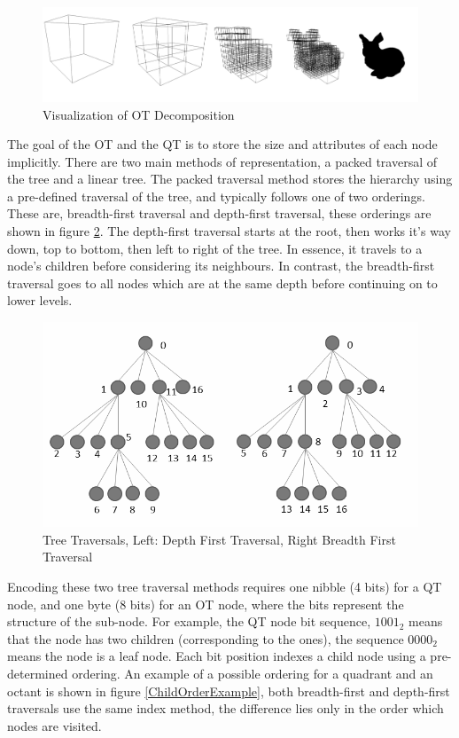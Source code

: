 \begin{figure}[!h]
\centering
\includegraphics[width=16cm]{images/ch2/OctreeExample}
\caption{Visualization of OT Decomposition}
\label{OctreeExample}
\end{figure}


The goal of the OT and the QT is to store the size and attributes of each node implicitly. There are two main methods of representation, a packed traversal of the tree and a linear tree. The packed traversal method stores the hierarchy using a pre-defined traversal of the tree, and typically follows one of two orderings. These are, breadth-first traversal and depth-first traversal, these orderings are shown in figure \ref{TreeTraversalExample}. The depth-first traversal starts at the root, then works it's way down, top to bottom, then left to right of the tree. In essence, it travels to a node's children before considering its neighbours. In contrast, the breadth-first traversal goes to all nodes which are at the same depth before continuing on to lower levels. 

\begin{figure}[!h]
\centering
\includegraphics[width=12cm]{images/ch2/TreeTraversalExample}
\caption{Tree Traversals, Left: Depth First Traversal, Right Breadth First Traversal}
\label{TreeTraversalExample}
\end{figure}

Encoding these two tree traversal methods requires one nibble (4 bits) for a QT node, and one byte (8 bits) for an OT node, where the bits represent the structure of the sub-node. For example, the QT node bit sequence, $1001_2$ means that the node has two children (corresponding to the ones), the sequence $0000_2$ means the node is a leaf node. Each bit position indexes a child node using a pre-determined ordering. An example of a possible ordering for a quadrant and an octant is shown in figure \ref{ChildOrderExample}, both breadth-first and depth-first traversals use the same index method, the difference lies only in the order which nodes are visited. 

